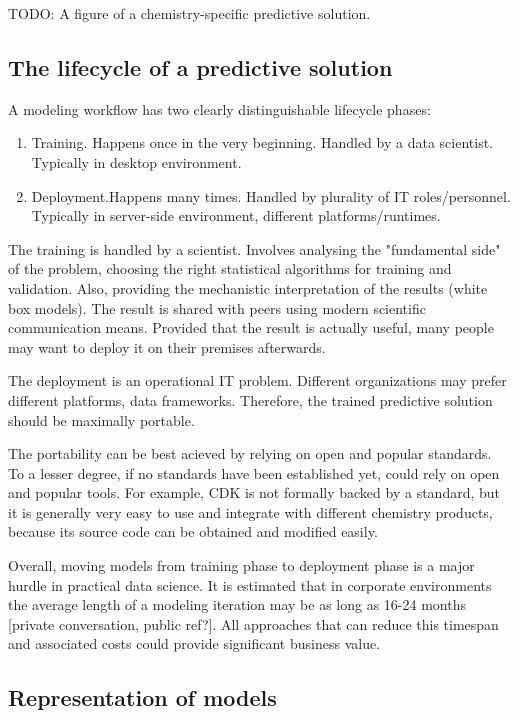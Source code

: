 \documentclass[12pt,letterpaper]{article}
\begin{document}
TODO: A figure of a chemistry-specific predictive solution.

\subsection{The lifecycle of a predictive solution}

A modeling workflow has two clearly distinguishable lifecycle phases:
\begin{enumerate}
  \item Training. Happens once in the very beginning. Handled by a data
  scientist. Typically in desktop environment. 
  \item Deployment.Happens many times. Handled by plurality of IT 
  roles/personnel. Typically in server-side environment, different 
  platforms/runtimes. 
\end{enumerate}

The training is handled by a scientist. Involves analysing the
"fundamental side" of the problem, choosing the right statistical 
algorithms for training and validation. Also, providing the mechanistic
interpretation of the results (white box models). The result is 
shared with peers using modern scientific communication means. Provided
that the result is actually useful, many people may want to deploy it
on their premises afterwards.

The deployment is an operational IT problem. Different organizations 
may prefer different platforms, data frameworks. Therefore, the trained
predictive solution should be maximally portable.

The portability can be best acieved by relying on open and popular
standards. To a lesser degree, if no standards have been established yet,
could rely on open and popular tools. For example, CDK is not formally
backed by a standard, but it is generally very easy to use and integrate
with different chemistry products, because its source code can be obtained
and modified easily.

Overall, moving models from training phase to deployment phase is a
major hurdle in practical data science. It is estimated that in corporate
environments the average length of a modeling iteration may be as long
as 16-24 months [private conversation, public ref?]. All approaches that
can reduce this timespan and associated costs could provide significant
business value.

\subsection{Representation of models}
\end{document}
